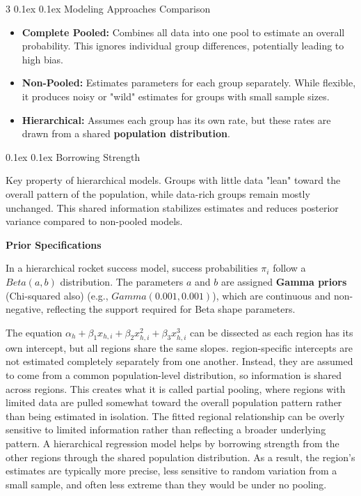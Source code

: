 \documentclass[8pt,landscape]{article}
\makeatletter
\renewcommand{\subsection}{\@startsection{subsection}{2}{0pt}%
    {0.1ex}%
    {0.1ex}%
    {\fontsize{8}{9}\bfseries\color{blue}}} %
\newcommand{\smalltext}[1]{
  {\fontsize{8}{9}\selectfont\sloppy #1\par}
}
\makeatother
\begin{document}
\begin{multicols}{3}
\subsection{Modeling Approaches Comparison}
\smalltext{
\begin{itemize}
    \item \textbf{Complete Pooled:} Combines all data into one pool to estimate an overall probability. This ignores individual group differences, potentially leading to high bias.
    \item \textbf{Non-Pooled:} Estimates parameters for each group separately. While flexible, it produces noisy or "wild" estimates for groups with small sample sizes.
    \item \textbf{Hierarchical:} Assumes each group has its own rate, but these rates are drawn from a shared \textbf{population distribution}.
\end{itemize}
}

\subsection{Borrowing Strength}
\smalltext{
  Key property of hierarchical models. Groups with little data "lean" toward the overall pattern of the population, while data-rich groups remain mostly unchanged. This shared information stabilizes estimates and reduces posterior variance compared to non-pooled models.
}

\textbf{Prior Specifications}
\smalltext{
In a hierarchical rocket success model, success probabilities $\pi_i$ follow a $Beta(a, b)$ distribution. The parameters $a$ and $b$ are assigned \textbf{Gamma priors} (Chi-squared also) (e.g., $Gamma(0.001, 0.001)$), which are continuous and non-negative, reflecting the support required for Beta shape parameters.

The equation $\alpha_h + \beta_1x_{h,i} + \beta_2x^2_{h,i} + \beta_3x^3_{h,i}$ can be dissected as  each region has its own intercept, but all regions share the same slopes. region-specific intercepts are not estimated completely separately from one another.
Instead, they are assumed to come from a common population-level distribution, so information is shared across regions. This creates what it is called partial pooling, where regions with limited data are pulled somewhat toward the overall population pattern rather than being estimated in isolation. The fitted regional relationship can be overly sensitive to limited information rather than reflecting a broader underlying pattern. A hierarchical regression model helps by borrowing strength from the other regions through the shared population distribution. As a result, the region’s estimates are typically more precise, less sensitive to random variation from a small sample, and often less extreme than they would be under no pooling.
}




\end{multicols}
\end{document}
